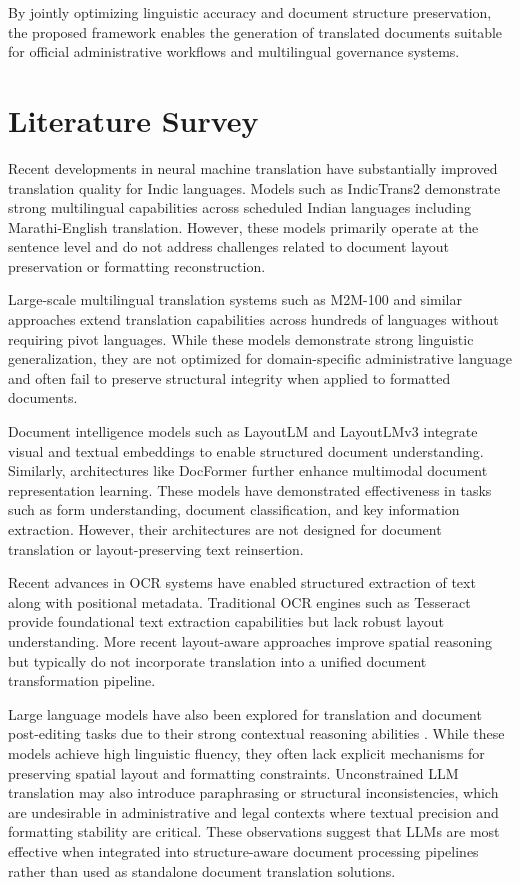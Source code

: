 \documentclass[11pt]{article}
\begin{document}
By jointly optimizing linguistic accuracy and document structure preservation, the proposed framework enables the generation of translated documents suitable for official administrative workflows and multilingual governance systems.


\section{Literature Survey}

Recent developments in neural machine translation have substantially improved translation quality for Indic languages. Models such as IndicTrans2 demonstrate strong multilingual capabilities across scheduled Indian languages including Marathi-English translation\cite{gala_indictrans2:_2023}. However, these models primarily operate at the sentence level and do not address challenges related to document layout preservation or formatting reconstruction.

Large-scale multilingual translation systems such as M2M-100 and similar approaches extend translation capabilities across hundreds of languages without requiring pivot languages\cite{fan_beyond_2020,team_no_2022}. While these models demonstrate strong linguistic generalization, they are not optimized for domain-specific administrative language and often fail to preserve structural integrity when applied to formatted documents.

Document intelligence models such as LayoutLM and LayoutLMv3 integrate visual and textual embeddings to enable structured document understanding\cite{xu_layoutlm:_2020,xu_layoutlmv2:_2022,huang_layoutlmv3:_2022}. Similarly, architectures like DocFormer further enhance multimodal document representation learning\cite{appalaraju_docformer:_2021}. These models have demonstrated effectiveness in tasks such as form understanding, document classification, and key information extraction. However, their architectures are not designed for document translation or layout-preserving text reinsertion.

Recent advances in OCR systems have enabled structured extraction of text along with positional metadata. Traditional OCR engines such as Tesseract provide foundational text extraction capabilities but lack robust layout understanding. More recent layout-aware approaches improve spatial reasoning but typically do not incorporate translation into a unified document transformation pipeline.

Large language models have also been explored for translation and document post-editing tasks due to their strong contextual reasoning abilities \cite{touvron_llama:_2023,zhao_survey_2026}. While these models achieve high linguistic fluency, they often lack explicit mechanisms for preserving spatial layout and formatting constraints. Unconstrained LLM translation may also introduce paraphrasing or structural inconsistencies, which are undesirable in administrative and legal contexts where textual precision and formatting stability are critical. These observations suggest that LLMs are most effective when integrated into structure-aware document processing pipelines rather than used as standalone document translation solutions.
\end{document}
